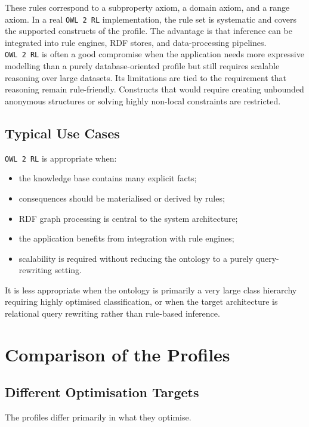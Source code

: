 \documentclass{scrbook}
\begin{document}
	These rules correspond to a subproperty axiom, a domain axiom, and a range axiom. In a real \texttt{OWL 2 RL} implementation, the rule set is systematic and covers the supported constructs of the profile. The advantage is that inference can be integrated into rule engines, RDF stores, and data-processing pipelines.\\
	
	\texttt{OWL 2 RL} is often a good compromise when the application needs more expressive modelling than a purely database-oriented profile but still requires scalable reasoning over large datasets. Its limitations are tied to the requirement that reasoning remain rule-friendly. Constructs that would require creating unbounded anonymous structures or solving highly non-local constraints are restricted.
	
	\subsection{Typical Use Cases}
	
	\texttt{OWL 2 RL} is appropriate when:
	\begin{itemize}
		\item the knowledge base contains many explicit facts;
		\item consequences should be materialised or derived by rules;
		\item RDF graph processing is central to the system architecture;
		\item the application benefits from integration with rule engines;
		\item scalability is required without reducing the ontology to a purely query-rewriting setting.
	\end{itemize}
	
	It is less appropriate when the ontology is primarily a very large class hierarchy requiring highly optimised classification, or when the target architecture is relational query rewriting rather than rule-based inference.
	
	\section{Comparison of the Profiles}
	
	\subsection{Different Optimisation Targets}
	
	The profiles differ primarily in what they optimise.\\
	
\end{document}
